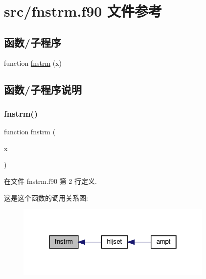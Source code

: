 \hypertarget{fnstrm_8f90}{}\section{src/fnstrm.f90 文件参考}
\label{fnstrm_8f90}
\subsection*{函数/子程序}
\begin{DoxyCompactItemize}
\item 
function \mbox{\hyperlink{fnstrm_8f90_aba932b14c95560fbd07741b8c84d5b20}{fnstrm}} (x)
\end{DoxyCompactItemize}


\subsection{函数/子程序说明}
\mbox{\label{fnstrm_8f90_aba932b14c95560fbd07741b8c84d5b20}} 
\subsubsection{\texorpdfstring{fnstrm()}{fnstrm()}}
{\footnotesize\ttfamily function fnstrm (\begin{DoxyParamCaption}\item[{}]{x }\end{DoxyParamCaption})}



在文件 fnstrm.\+f90 第 2 行定义.

这是这个函数的调用关系图\+:
\nopagebreak
\begin{figure}[H]
\begin{center}
\leavevmode
\includegraphics[width=274pt]{fnstrm_8f90_aba932b14c95560fbd07741b8c84d5b20_icgraph}
\end{center}
\end{figure}
